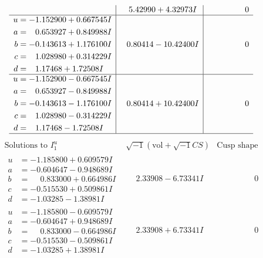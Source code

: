 \documentclass[1p]{elsarticle_modified}
\theoremstyle{definition}
\newcommand{\I}{\sqrt{-1}}
\begin{document}
$$\begin{array}{c|c|c}
 & \phantom{-}5.42990 + 4.32973 I & \phantom{-0.000000 } 0 \\ \hline\begin{aligned}
u &= -1.152900 + 0.667545 I \\
a &= \phantom{-}0.653927 + 0.849988 I \\
b &= -0.143613 + 1.176100 I \\
c &= \phantom{-}1.028980 + 0.314229 I \\
d &= \phantom{-}1.17468 + 1.72508 I\end{aligned}
 & \phantom{-}0.80414 - 10.42400 I & \phantom{-0.000000 } 0 \\ \hline\begin{aligned}
u &= -1.152900 - 0.667545 I \\
a &= \phantom{-}0.653927 - 0.849988 I \\
b &= -0.143613 - 1.176100 I \\
c &= \phantom{-}1.028980 - 0.314229 I \\
d &= \phantom{-}1.17468 - 1.72508 I\end{aligned}
 & \phantom{-}0.80414 + 10.42400 I & \phantom{-0.000000 } 0\\
 \hline 
 \end{array}$$\newpage$$\begin{array}{c|c|c}  
\text{Solutions to }I^u_{1}& \I (\text{vol} + \sqrt{-1}CS) & \text{Cusp shape}\\
 \hline 
\begin{aligned}
u &= -1.185800 + 0.609579 I \\
a &= -0.604647 - 0.948689 I \\
b &= \phantom{-}0.833000 + 0.664986 I \\
c &= -0.515530 + 0.509861 I \\
d &= -1.03285 - 1.38981 I\end{aligned}
 & \phantom{-}2.33908 - 6.73341 I & \phantom{-0.000000 } 0 \\ \hline\begin{aligned}
u &= -1.185800 - 0.609579 I \\
a &= -0.604647 + 0.948689 I \\
b &= \phantom{-}0.833000 - 0.664986 I \\
c &= -0.515530 - 0.509861 I \\
d &= -1.03285 + 1.38981 I\end{aligned}
 & \phantom{-}2.33908 + 6.73341 I & \phantom{-0.000000 } 0 \\ \hline\begin{aligned}

\end{aligned}
\end{array}$$
\end{document}
